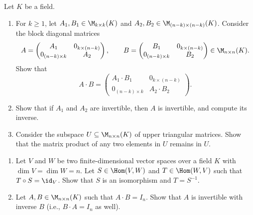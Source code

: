 \begin{exercise}
\label{exc:block_diagonal_upper_triangular_mult}
Let $K$ be a field.
\begin{enumerate}
    \item For $k \ge 1$, let $A_1, B_1 \in \M_{k \times k}(K)$ and $A_2, B_2 \in \M_{(n-k) \times (n-k)}(K)$. Consider the block diagonal matrices
    \[
    A = \begin{pmatrix} A_1 & 0_{k \times (n-k)} \\ 0_{(n-k) \times k} & A_2 \end{pmatrix}, \qquad
    B = \begin{pmatrix} B_1 & 0_{k \times (n-k)} \\ 0_{(n-k) \times k} & B_2 \end{pmatrix} \in \M_{n \times n}(K).
    \]
    Show that
    \[
    A \cdot B = \begin{pmatrix} A_1 \cdot B_1 & 0_{k \times (n-k)} \\ 0_{(n-k) \times k} & A_2 \cdot B_2 \end{pmatrix}.
    \]
    \item Show that if $A_1$ and $A_2$ are invertible, then $A$ is invertible, and compute its inverse.
    \item Consider the subspace $U \subseteq \M_{n \times n}(K)$ of upper triangular matrices. Show that the matrix product of any two elements in $U$ remains in $U$.
\end{enumerate}
\end{exercise}

\begin{exercise}
\label{exc:one_sided_inverse_finite_dim}
\begin{enumerate}
    \item Let $V$ and $W$ be two finite-di\-men\-sional vector spaces over a field $K$ with $\dim V = \dim W = n$. Let $S \in \Hom(V, W)$ and $T \in \Hom(W, V)$ such that $T \circ S = \id_V$. Show that $S$ is an isomorphism and $T = S^{-1}$.
    \item Let $A, B \in \M_{n \times n}(K)$ such that $A \cdot B = I_n$. Show that $A$ is invertible with inverse $B$ (i.e., $B \cdot A = I_n$ as well).
\end{enumerate}
\end{exercise}


